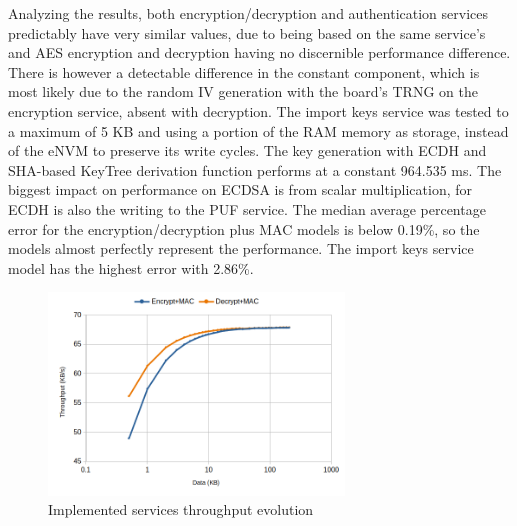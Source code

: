 Analyzing the results, both encryption/decryption and authentication services predictably have very similar values, due to being based on the same service's and \ac{AES} encryption and decryption having no discernible performance difference.
There is however a detectable difference in the constant component, which is most likely due to the random \ac{IV} generation with the board's \ac{TRNG} on the encryption service, absent with decryption.
The import keys service was tested to a maximum of 5 KB and using a portion of the RAM memory as storage, instead of the eNVM to preserve its write cycles.
The key generation with \ac{ECDH} and \ac{SHA}-based KeyTree derivation function performs at a constant 964.535 ms.
The biggest impact on performance on \ac{ECDSA} is from scalar multiplication, for \ac{ECDH} is also the writing to the \ac{PUF} service.
The median average percentage error for the encryption/decryption plus MAC models is below 0.19\%, so the models almost perfectly represent the performance. The import keys service model has the highest error with 2.86\%.

\begin{figure}[h!]
	\centering
	\includegraphics[width=0.7\textwidth]{./Images/services-tput.png}
	\caption{Implemented services throughput evolution}
	\label{fig:performance:services-tput}
\end{figure}

